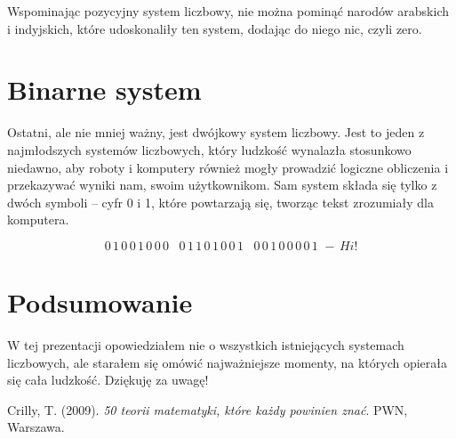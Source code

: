 \documentclass[12pt]{article}
\begin{document}
Wspominając pozycyjny system liczbowy, nie można pominąć narodów arabskich i indyjskich, które udoskonaliły ten system, dodając do niego nic, czyli zero.

\newpage

\section{Binarne system }
\large

Ostatni, ale nie mniej ważny, jest dwójkowy system liczbowy.
Jest to jeden z najmłodszych systemów liczbowych, który ludzkość wynalazła stosunkowo niedawno, aby roboty i komputery również mogły prowadzić logiczne obliczenia i przekazywać wyniki nam, swoim użytkownikom. Sam system składa się tylko z dwóch symboli – cyfr 0 i 1, które powtarzają się, tworząc tekst zrozumiały dla komputera.

\begin{ex}
\begin{equation*}
0\,1\,0\,0\,1\,0\,0\,0\,\,\,\,\,0\,1\,1\,0\,1\,0\,0\,1\,\,\,\,\,0\,0\,1\,0\,0\,0\,0\,1\,\,-\,Hi!
\end{equation*}
\end{ex}

\newpage

\section{Podsumowanie}
\large

W tej prezentacji opowiedziałem nie o wszystkich istniejących systemach liczbowych, ale starałem się omówić najważniejsze momenty, na których opierała się cała ludzkość. Dziękuję za uwagę!


\begin{thebibliography}{9}

Crilly, T. (2009). \textit{50 teorii matematyki, które każdy powinien znać}. PWN, Warszawa.


\end{thebibliography}
\end{document}
